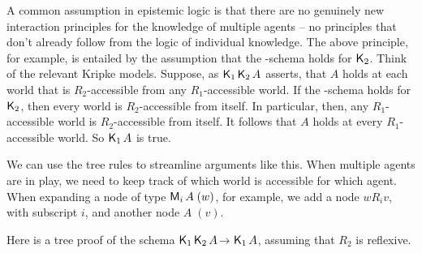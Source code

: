 A common assumption in epistemic logic is that there are no genuinely new
interaction principles for the knowledge of multiple agents -- no principles
that don't already follow from the logic of individual knowledge. The above
principle, for example, is entailed by the assumption that the -schema
holds for $\operatorname{\mathsf{K}{}}_2$. Think of the relevant Kripke models. Suppose, as
$\operatorname{\mathsf{K}{}}_1 \operatorname{\mathsf{K}{}}_2 A$ asserts, that $A$ holds at each world that is $R_2$-accessible
from any $R_1$-accessible world. If the -schema holds for $\operatorname{\mathsf{K}{}}_2$, then
every world is $R_{2}$-accessible from itself. In particular, then, any
$R_1$-accessible world is $R_2$-accessible from itself. It follows that $A$
holds at every $R_1$-accessible world. So $\operatorname{\mathsf{K}{}}_1 A$ is true.


We can use the tree rules to streamline arguments like this. When multiple
agents are in play, we need to keep track of which world is accessible for which
agent. When expanding a node of type $\operatorname{\mathsf{M}}_{i} A\; (w)$, for example, we add a
node $wR_{i}v$, with subscript $i$, and another node $A\; (v)$.

Here is a tree proof of the schema $\Kn_{1}\Kn_{2} A \to \Kn_{1} A$, assuming
that $R_{2}$ is reflexive. \bigskip
  \begin{center}
  \end{center}

